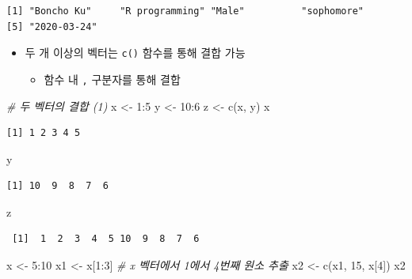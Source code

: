 \documentclass[
  11pt,
]{krantz}
\newenvironment{Shaded}{\begin{snugshade}}{\end{snugshade}}
\newcommand{\CommentTok}[1]{\textcolor[rgb]{0.37,0.37,0.37}{\textit{#1}}}
\newcommand{\DecValTok}[1]{\textcolor[rgb]{0.06,0.06,0.06}{#1}}
\newcommand{\FunctionTok}[1]{\textcolor[rgb]{0,0,0}{#1}}
\newcommand{\NormalTok}[1]{#1}
\newcommand{\OtherTok}[1]{\textcolor[rgb]{0.37,0.37,0.37}{#1}}
\newcommand{\SpecialCharTok}[1]{\textcolor[rgb]{0,0,0}{#1}}
\providecommand{\tightlist}{%
  \setlength{\itemsep}{0pt}\setlength{\parskip}{0pt}}
\begin{document}
\begin{verbatim}
[1] "Boncho Ku"     "R programming" "Male"          "sophomore"    
[5] "2020-03-24"   
\end{verbatim}

\normalsize

\begin{itemize}
\tightlist
\item
  두 개 이상의 벡터는 \texttt{c()} 함수를 통해 결합 가능

  \begin{itemize}
  \tightlist
  \item
    함수 내 \texttt{,} 구분자를 통해 결합
  \end{itemize}
\end{itemize}

\footnotesize

\begin{Shaded}
\begin{Highlighting}[]
\CommentTok{\# 두 벡터의 결합 (1)}
\NormalTok{x }\OtherTok{\textless{}{-}} \DecValTok{1}\SpecialCharTok{:}\DecValTok{5}
\NormalTok{y }\OtherTok{\textless{}{-}} \DecValTok{10}\SpecialCharTok{:}\DecValTok{6}
\NormalTok{z }\OtherTok{\textless{}{-}} \FunctionTok{c}\NormalTok{(x, y)}
\NormalTok{x}
\end{Highlighting}
\end{Shaded}

\begin{verbatim}
[1] 1 2 3 4 5
\end{verbatim}

\begin{Shaded}
\begin{Highlighting}[]
\NormalTok{y}
\end{Highlighting}
\end{Shaded}

\begin{verbatim}
[1] 10  9  8  7  6
\end{verbatim}

\begin{Shaded}
\begin{Highlighting}[]
\NormalTok{z}
\end{Highlighting}
\end{Shaded}

\begin{verbatim}
 [1]  1  2  3  4  5 10  9  8  7  6
\end{verbatim}

\begin{Shaded}
\begin{Highlighting}[]
\NormalTok{x }\OtherTok{\textless{}{-}} \DecValTok{5}\SpecialCharTok{:}\DecValTok{10}
\NormalTok{x1 }\OtherTok{\textless{}{-}}\NormalTok{ x[}\DecValTok{1}\SpecialCharTok{:}\DecValTok{3}\NormalTok{] }\CommentTok{\# x 벡터에서 1에서 4번째 원소 추출}
\NormalTok{x2 }\OtherTok{\textless{}{-}} \FunctionTok{c}\NormalTok{(x1, }\DecValTok{15}\NormalTok{, x[}\DecValTok{4}\NormalTok{])}
\NormalTok{x2}
\end{Highlighting}
\end{Shaded}
\end{document}
